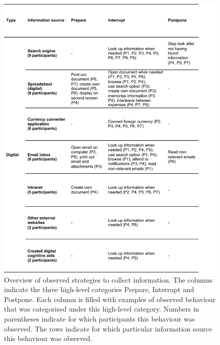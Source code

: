 \begin{figure}
\centering
\includegraphics[scale=0.8]{images/ch12/ch12_TableDig.pdf}
\caption{Overview of observed strategies to collect information. The columns indicate the three high-level categories Prepare, Interrupt and Postpone. Each column is filled with examples of observed behaviour that was categorised under this high-level category. Numbers in parentheses indicate for which participants this behaviour was observed. The rows indicate for which particular information source this behaviour was observed.}
\label{tbl:ch12_Table2}
\end{figure}

